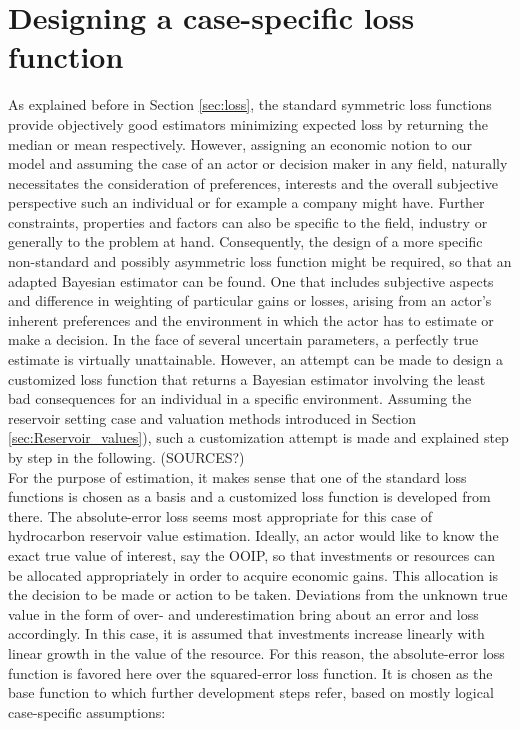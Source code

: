 		\section{Designing a case-specific loss function}\label{sec:LF_design}	
		As explained before in Section \ref{sec:loss}, the standard symmetric loss functions provide objectively good estimators minimizing expected loss by returning the median or mean respectively. However, assigning an economic notion to our model and assuming the case of an actor or decision maker in any field, naturally necessitates the consideration of preferences, interests and the overall subjective perspective such an individual or for example a company might have. Further constraints, properties and factors can also be specific to the field, industry or generally to the problem at hand. Consequently, the design of a more specific non-standard and possibly asymmetric loss function might be required, so that an adapted Bayesian estimator can be found. One that includes subjective aspects and difference in weighting of particular gains or losses, arising from an actor's inherent preferences and the environment in which the actor has to estimate or make a decision. In the face of several uncertain parameters, a perfectly true estimate is virtually unattainable. However, an attempt can be made to design a customized loss function that returns a Bayesian estimator involving the least bad consequences for an individual in a specific environment. Assuming the reservoir setting case and valuation methods introduced in Section \ref{sec:Reservoir_values}), such a customization attempt is made and explained step by step in the following. (SOURCES?)\\
		For the purpose of estimation, it makes sense that one of the standard loss functions is chosen as a basis and a customized loss function is developed from there. The absolute-error loss seems most appropriate for this case of hydrocarbon reservoir value estimation. Ideally, an actor would like to know the exact true value of interest, say the OOIP, so that investments or resources can be allocated appropriately in order to acquire economic gains. This allocation is the decision to be made or action to be taken. Deviations from the unknown true value in the form of over- and underestimation bring about an error and loss accordingly. In this case, it is assumed that investments increase linearly with linear growth in the value of the resource. For this reason, the absolute-error loss function is favored here over the squared-error loss function. It is chosen as the base function to which further development steps refer, based on mostly logical case-specific assumptions:
		
